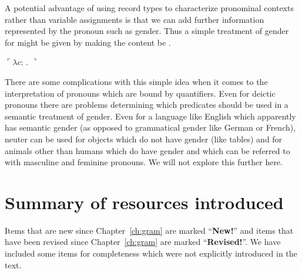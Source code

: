 A potential advantage of using record types to characterize pronominal contexts
rather than variable assignments is that we can add further
information represented by the pronoun such as gender.   Thus a simple
treatment of gender for \preveg{} might be given by making the content
be \nexteg{}.
\begin{ex}
  $\ulcorner\lambda c$:
                                 . 
$\urcorner$ 
\end{ex} 
There are some complications with this simple
idea when it comes to the interpretation of pronouns which are bound
by quantifiers.  Even for deictic pronouns there are problems
determining which predicates should be used in a semantic treatment of
gender.  Even for a language like English which apparently has
semantic gender (as opposed to grammatical gender like German or
French), neuter can be used for objects which do not have gender (like
tables) and for animals other than humans which do have gender and
which can be referred to with masculine and feminine pronouns.  We
will not explore this further here.


\section{Summary of resources introduced}


Items that are new since Chapter~\ref{ch:gram} are marked
``\textbf{New!}'' and items that have been revised since
Chapter~\ref{ch:gram} are marked ``\textbf{Revised!}''.  We have
included some items for completeness which were not explicitly
introduced in the text.

